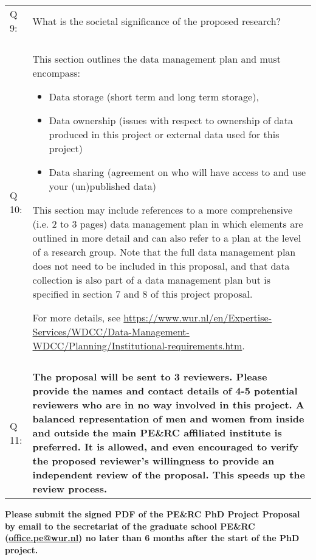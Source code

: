 \documentclass[10pt]{article}
\begin{document}
\begin{tabularx}{\textwidth}[]{p{1.5cm}X}
Q 9: & What is the societal significance of the proposed research?\\ \\

Q 10: & This section outlines the data management plan and must encompass:
\begin{itemize}[nosep]
 \item Data storage (short term and long term storage), 
 \item Data ownership (issues with respect to ownership of data produced in this project or external data used for this project)
 \item Data sharing (agreement on who will have access to and use your (un)published data)
\end{itemize}
This section may include references to a more comprehensive (i.e. 2 to 3 pages) data management plan in which elements are outlined in more detail and can also refer to a plan at the level of a research group. Note that the full data management plan does not need to be included in this proposal, and that data collection is also part of a data management plan but is specified in section 7 and 8 of this project proposal.

For more details, see \url{https://www.wur.nl/en/Expertise-Services/WDCC/Data-Management-WDCC/Planning/Institutional-requirements.htm}.\\ \\

Q 11: & \textbf{The proposal will be sent to 3 reviewers. Please provide the names and contact details of 4-5 potential reviewers who are in no way involved in this project. A balanced representation of men and women from inside and outside the main PE\&RC affiliated institute is preferred. It is allowed, and even encouraged to verify the proposed reviewer’s willingness to provide an independent review of the proposal. This speeds up the review process.}
\end{tabularx}

\vfill

\textbf{Please submit the signed PDF of the PE\&RC PhD Project Proposal by email to the secretariat of the graduate school PE\&RC (\href{mailto:office.pe@wur.nl}{office.pe@wur.nl}) no later than 6 months after the start of the PhD project.}

\vfill
\end{document}
